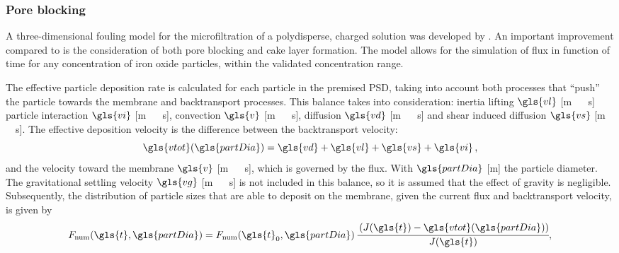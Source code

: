 \subsubsection{Pore blocking}
A three-dimensional fouling model for the microfiltration of a polydisperse, charged solution was developed by \cite{Yoon1999}. An important improvement compared to \cite{Lu1993} is the consideration of both pore blocking and cake layer formation. The model allows for the simulation of flux in function of time for any concentration of iron oxide particles, within the validated concentration range. \par
The effective particle deposition rate is calculated for each particle in the premised \gls{PSD}, taking into account both processes that ``push'' the particle towards the membrane and backtransport processes. This balance takes into consideration: inertia lifting $\gls{vl}$ [\unit{\metre\, \reciprocal\second}] particle interaction $\gls{vi}$ [\unit{\metre\, \reciprocal\second}], convection $\gls{v}$ [\unit{\metre\, \reciprocal\second}], diffusion $\gls{vd}$ [\unit{\metre\, \reciprocal\second}] and shear induced diffusion $\gls{vs}$ [\unit{\metre\, \reciprocal\second}]. The effective deposition velocity is the difference between the backtransport velocity:
\begin{equation}
\gls{vtot}(\gls{partDia})=\gls{vd}+\gls{vl}+\gls{vs}+\gls{vi}
\label{yoonsum}\, ,
\end{equation}
and the velocity toward the membrane $\gls{v}$ [\unit{\metre\, \reciprocal\second}], which is governed by the flux. With $\gls{partDia}$ [\unit{\metre}] the particle diameter. The gravitational settling velocity $\gls{vg}$ [\unit{\metre\, \reciprocal\second}] is not included in this balance, so it is assumed that the effect of gravity is negligible. Subsequently, the distribution of particle sizes that are able to deposit on the membrane, given the current flux and backtransport velocity, is given by 
\begin{equation}
F_{\mathrm{num}}(\gls{t},\gls{partDia})=F_{\mathrm{num}}(\gls{t}_\mathrm{0},\gls{partDia}) \, \cfrac{\left( J(\gls{t}) - \gls{vtot}(\gls{partDia})\right)}{J(\gls{t})}
\label{Yoon1999Dist} ,
\end{equation}

